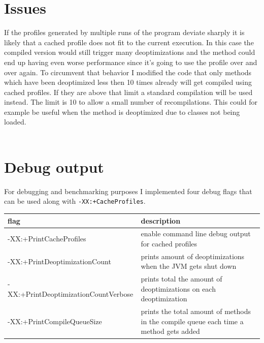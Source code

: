 \section{Issues}
\label{s:issues}
If the profiles generated by multiple runs of the program deviate sharply it is likely that a cached profile does not fit to the current execution. In this case the compiled version would still trigger many deoptimizations and the method could end up having even worse performance since it's going to use the profile over and over again.
To circumvent that behavior I modified the code that only methods which have been deoptimized less then 10 times already will get compiled using cached profiles. If they are above that limit a standard compilation will be used instead.
The limit is 10 to allow a small number of recompilations. This could for example be useful when the method is deoptimized due to classes not being loaded. 
\\\\

\section{Debug output}
\label{s:debugoutput}
For debugging and benchmarking purposes I implemented four debug flags that can be used along with \texttt{-XX:+CacheProfiles}.
\begin{table}[ht]
  \centering
  \label{t:debugflags}
  \begin{center}
    \begin{tabular}{| l | p{9.0cm} |}
       \hline
       \textbf{flag} & \textbf{description} \\ \hline\hline
       -XX:+PrintCacheProfiles & enable command line debug output for cached profiles\\ \hline
       -XX:+PrintDeoptimizationCount & prints amount of deoptimizations when the JVM gets shut down\\ \hline
       -XX:+PrintDeoptimizationCountVerbose & prints total the amount of deoptimizations on each deoptimization\\ \hline
       -XX:+PrintCompileQueueSize & prints the total amount of methods in the compile queue each time a method gets added \\ \hline
    \end{tabular}
  \end{center}
\end{table}

 

